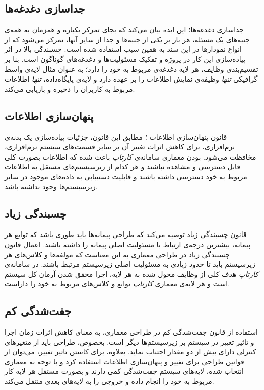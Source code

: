 \documentclass[12pt,svgnames,oneside]{book}
\begin{document}
\subsection{جداسازی دغدغه‌ها}
جداسازی دغدغه‌ها؛ این ایده بیان می‌کند که بجای تمرکز یکباره و همزمان به همه‌ی جنبه‌های یک مسئله، هر بار بر \textit{یکی} از جنبه‌ها و جدا از سایر آنها، تمرکز می‌شود که از انواع نمودار‌ها در این سند به همین سبب استفاده شده است. چسبندگی بالا در اثر پیاده‌سازی این کار در پروژه و تفکیک مسئولیت‌ها و دغدغه‌های گوناگون است. بنا بر تقسیم‌بندی وظایف، هر لایه دغدغه‌ی مربوط به خود را دارد؛ به عنوان مثال لایه‌ی واسط گرافیکی \textit{تنها} وظیفه‌ی نمایش اطلاعات را بر عهده دارد و لایه‌ی پایگاه‌داده، \textit{تنها} اطلاعات مربوط به کاربران را ذخیره و بازیابی می‌کند.

\subsection{پنهان‌سازی اطلاعات}
قانون پنهان‌سازی اطلاعات
؛
مطابق این قانون، جزئیات پیاده‌سازی یک بدنه‌ی نرم‌افزاری، برای کاهش اثرات تغییر آن بر سایر قسمت‌های سیستم نرم‌افزاری، مخافظت می‌شود.  بودن معماری سامانه‌ی \textit{کارتاپ} باعث شده که اطلاعات بصورت کلی قابل دسترسی و مشاهده نباشند و هر کدام از زیرسیستم‌های مستقل به اطلاعات مربوط به خود دسترسی داشته باشند و قابلیت دستیبابی به داده‌های موجود در سایر زیرسیستم‌ها وجود نداشته باشد.

\subsection{چسبندگی زیاد}
قانون چسبندگی زیاد توصیه می‌کند که طراحی پیمانه‌ها
 باید طوری باشد که توابع هر پیمانه، بیشترین درجه‌ی ارتباط با مسئولیت اصلی پیمانه را داشته باشند. اعمال قانون چسبندگی زیاد در طراحی معماری به این معناست که مولفه‌ها و کلاس‌های هر زیرسیستم باید تا حدود زیادی به مسئولیت اصلی زیرسیستم مرتبط باشند. در سامانه‌ی \textit{کارتاپ} هدف کلی از وظایف محول شده به هر لایه، اجرا محقق شدن آرمان کل سیستم است و هر لایه‌ی معماری \textit{کارتاپ} توابع و کلاس‌های مربوط به خود را داراست.

\subsection{جفت‌شدگی کم}
استفاده از قانون جفت‌شدگی کم در طراحی معماری، به معنای کاهش اثرات زمان اجرا و تاثیر تغییر در سیستم بر زیرسیستم‌ها دیگر است. بخصوص، طراحی باید از متغیر‌های کنترلی دارای بیش از دو مقدار اجتناب نماید. بعلاوه، برای کاستن تاثیر تغییر، می‌توان از قوانین طراحی برای تغییر و پنهان‌سازی اطلاعات استفاده کرد و با توجه به معماری  انتخاب شده، لایه‌های سیستم جفت‌شدگی کمی دارند و بصورت مستقل هر لایه کار مربوط به خود را انجام داده و خروجی را به لایه‌های بعدی منتقل می‌کند.
\end{document}

